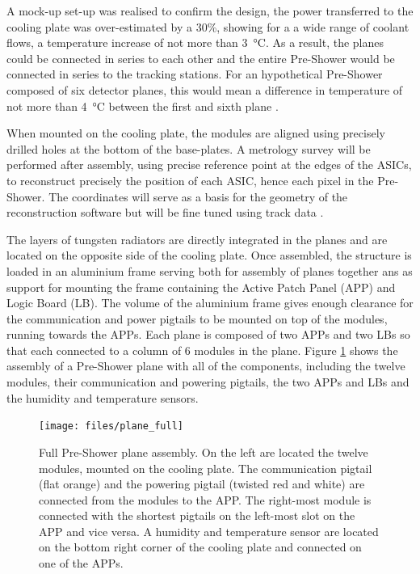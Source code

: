 		A mock-up set-up was realised to confirm the design, the power transferred to the cooling plate was over-estimated by a 30\%, showing for a a wide range of coolant flows, a temperature increase of not more than \SI{3}{\celsius}. As a result, the planes could be connected in series to each other and the entire Pre-Shower would be connected in series to the tracking stations. For an hypothetical Pre-Shower composed of six detector planes, this would mean a difference in temperature of not more than \SI{4}{\celsius} between the first and sixth plane \cite{PreShower_TP}.
		
		When mounted on the cooling plate, the modules are aligned using precisely drilled holes at the bottom of the base-plates. A metrology survey will be performed after assembly, using precise reference point at the edges of the ASICs, to reconstruct precisely the position of each ASIC, hence each pixel in the Pre-Shower. The coordinates will serve as a basis for the geometry of the reconstruction software but will be fine tuned using track data \cite{PreShower_TP}.
		
		The layers of tungsten radiators are directly integrated in the planes and are located on the opposite side of the cooling plate. Once assembled, the structure is loaded in an aluminium frame serving both for assembly of planes together ans as support for mounting the frame containing the Active Patch Panel (APP) and Logic Board (LB). The volume of the aluminium frame gives enough clearance for the communication and power pigtails to be mounted on top of the modules, running towards the APPs. Each plane is composed of two APPs and two LBs so that each connected to a column of 6 modules in the plane. Figure \ref{im:plane_full} shows the assembly of a Pre-Shower plane with all of the components, including the twelve modules, their communication and powering pigtails, the two APPs and LBs and the humidity and temperature sensors.
		
		\begin{figure}[h]
			\centering
			\texttt{[image: files/plane\_full]}
			\caption{Full Pre-Shower plane assembly. On the left are located the twelve modules, mounted on the cooling plate. The communication pigtail (flat orange) and the powering pigtail (twisted red and white) are connected from the modules to the APP. The right-most module is connected with the shortest pigtails on the left-most slot on the APP and vice versa. A humidity and temperature sensor are located on the bottom right corner of the cooling plate and connected on one of the APPs.}
			\label{im:plane_full}
		\end{figure}
		
